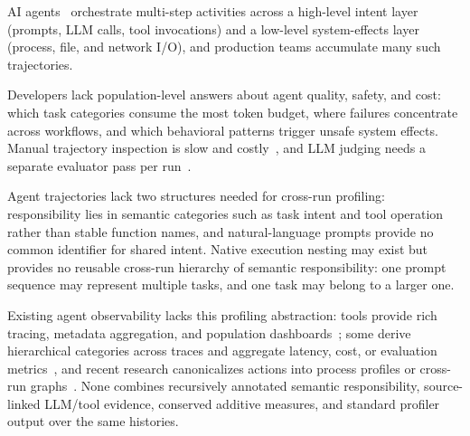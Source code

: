 \documentclass[letterpaper]{article}
\begin{document}
AI agents~\cite{sweagent,codex,claudecode,osworld} orchestrate multi-step
activities across a high-level intent layer (prompts, LLM calls, tool
invocations) and a low-level system-effects layer (process, file, and network
I/O), and production teams accumulate many such trajectories.

Developers lack population-level answers about agent quality, safety, and cost:
which task categories consume the most token budget, where failures concentrate
across workflows, and which behavioral patterns trigger unsafe system effects.
Manual trajectory inspection is slow and costly~\cite{agentrewardbench}, and
LLM judging needs a separate evaluator pass per
run~\cite{agentrewardbench,llm-as-judge}.

Agent trajectories lack two structures needed for cross-run profiling:
responsibility lies in semantic categories such as task intent and tool
operation rather than stable function names, and natural-language prompts
provide no common identifier for shared intent.
Native execution nesting may exist but provides no reusable cross-run hierarchy
of semantic responsibility: one prompt sequence may represent multiple tasks,
and one task may belong to a larger one.

Existing agent observability lacks this profiling abstraction: tools provide
rich tracing, metadata aggregation, and population
dashboards~\cite{langsmith,langfuse,otel,datadog-llmobs};
some derive hierarchical categories across traces and aggregate latency, cost,
or evaluation metrics~\cite{langsmith-insights,datadog-patterns}, and recent
research canonicalizes actions into process profiles or cross-run
graphs~\cite{traceprobe2026,graphectory2026,hodoscope2026,
tracegraph2026,actonomy2026,chief2026}. None combines recursively annotated
semantic responsibility, source-linked LLM/tool evidence, conserved additive
measures, and standard profiler output over the same histories.
\end{document}
